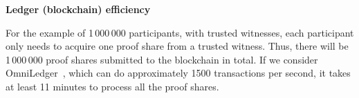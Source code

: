 \textbf{Ledger (blockchain) efficiency}

For the example of 1\,000\,000 participants, with trusted witnesses, each 
participant only needs to acquire one proof share from a trusted witness.
Thus, there will be 1\,000\,000 proof shares submitted to the blockchain in total.
If we consider OmniLedger~\cite{OmniLedger}, which can do approximately 1500 transactions per second, it takes at least 11 minutes to process all the proof shares.




